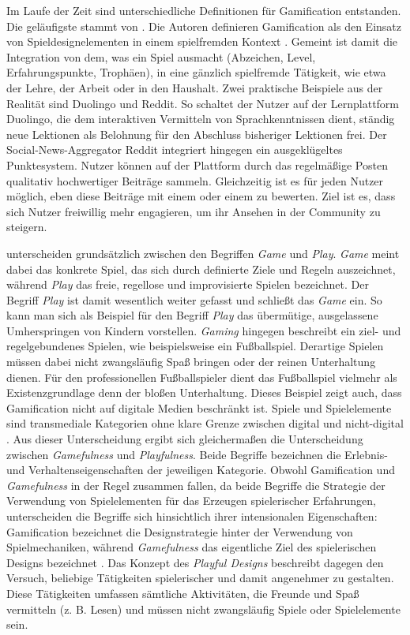 Im Laufe der Zeit sind unterschiedliche Definitionen für Gamification entstanden. Die geläufigste stammt von . Die Autoren definieren Gamification als den Einsatz von Spieldesignelementen in einem spielfremden Kontext \cite{deterding_game_2011}. Gemeint ist damit die Integration von dem, was ein Spiel ausmacht (Abzeichen, Level, Erfahrungspunkte, Trophäen), in eine gänzlich spielfremde Tätigkeit, wie etwa der Lehre, der Arbeit oder in den Haushalt. Zwei praktische Beispiele aus der Realität sind Duolingo und Reddit. So schaltet der Nutzer auf der Lernplattform Duolingo, die dem interaktiven Vermitteln von Sprachkenntnissen dient, ständig neue Lektionen als Belohnung für den Abschluss bisheriger Lektionen frei. Der Social-News-Aggregator Reddit integriert hingegen ein ausgeklügeltes Punktesystem. Nutzer können auf der Plattform durch das regelmäßige Posten qualitativ hochwertiger Beiträge  sammeln. Gleichzeitig ist es für jeden Nutzer möglich, eben diese Beiträge mit einem  oder einem  zu bewerten. Ziel ist es, dass sich Nutzer freiwillig mehr engagieren, um ihr Ansehen in der Community zu steigern.

 unterscheiden grundsätzlich zwischen den Begriffen \textit{Game} und \textit{Play}. \textit{Game} meint dabei das konkrete Spiel, das sich durch definierte Ziele und Regeln auszeichnet, während \textit{Play} das freie, regellose und improvisierte Spielen bezeichnet. Der Begriff \textit{Play} ist damit wesentlich weiter gefasst und schließt das \textit{Game} ein. So kann man sich als Beispiel für den Begriff \textit{Play} das übermütige, ausgelassene Umherspringen von Kindern vorstellen. \textit{Gaming} hingegen beschreibt ein ziel- und regelgebundenes Spielen, wie beispielsweise ein Fußballspiel. Derartige Spielen müssen dabei nicht zwangsläufig Spaß bringen oder der reinen Unterhaltung dienen. Für den professionellen Fußballspieler dient das Fußballspiel vielmehr als  Existenzgrundlage denn der bloßen Unterhaltung. Dieses Beispiel zeigt auch, dass Gamification nicht auf digitale Medien beschränkt ist.  Spiele und Spielelemente sind transmediale Kategorien ohne klare Grenze zwischen digital und nicht-digital \cite{deterding_game_2011}. Aus dieser Unterscheidung ergibt sich gleichermaßen die Unterscheidung zwischen \textit{Gamefulness} und \textit{Playfulness}. Beide Begriffe bezeichnen die Erlebnis- und Verhaltenseigenschaften der jeweiligen Kategorie. Obwohl Gamification und \textit{Gamefulness} in der Regel zusammen fallen, da beide Begriffe die Strategie der Verwendung von Spielelementen für das Erzeugen spielerischer Erfahrungen, unterscheiden die Begriffe sich hinsichtlich ihrer intensionalen Eigenschaften: Gamification bezeichnet die Designstrategie hinter der Verwendung von Spielmechaniken, während \textit{Gamefulness} das eigentliche Ziel des spielerischen Designs bezeichnet \cite{deterding_game_2011}. Das Konzept des \textit{Playful Designs} beschreibt dagegen den Versuch, beliebige Tätigkeiten spielerischer und damit angenehmer zu gestalten. Diese Tätigkeiten umfassen sämtliche Aktivitäten, die Freunde und Spaß vermitteln (z. B. Lesen) und müssen nicht zwangsläufig Spiele oder Spielelemente sein.



